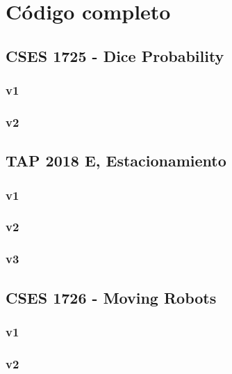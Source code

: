 \documentclass[../main.tex]{subfiles}
\begin{document}
\section{Código completo}

\subsection{CSES 1725 - Dice Probability}

\subsubsection{v1}


\subsubsection{v2}


\subsection{TAP 2018 E, Estacionamiento}

\subsubsection{v1}


\subsubsection{v2}


\subsubsection{v3}


\subsection{CSES 1726 - Moving Robots}

\subsubsection{v1}


\subsubsection{v2}

\end{document}
